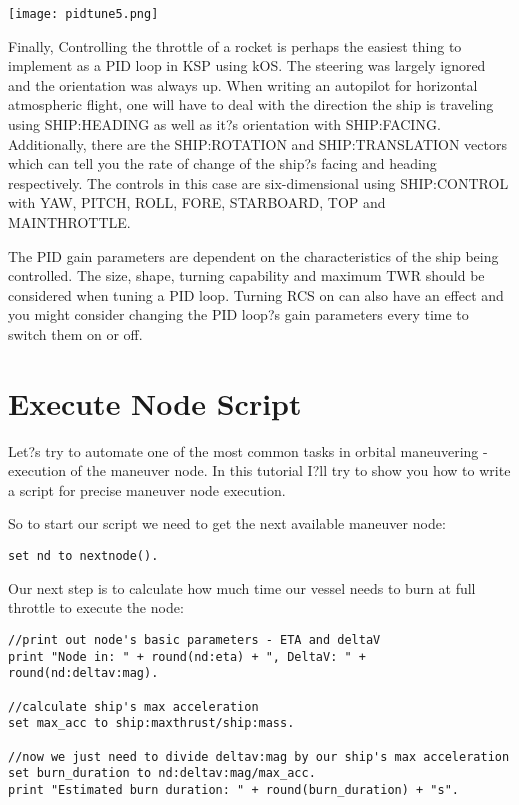 \begin{center}
\texttt{[image: pidtune5.png]}
\end{center}

Finally, Controlling the throttle of a rocket is perhaps the easiest thing to implement as a PID loop in KSP using kOS. The steering was largely ignored and the orientation was always up. When writing an autopilot for horizontal atmospheric flight, one will have to deal with the direction the ship is traveling using SHIP:HEADING as well as it?s orientation with SHIP:FACING. Additionally, there are the SHIP:ROTATION and SHIP:TRANSLATION vectors which can tell you the rate of change of the ship?s facing and heading respectively. The controls in this case are six-dimensional using SHIP:CONTROL with YAW, PITCH, ROLL, FORE, STARBOARD, TOP and MAINTHROTTLE.

The PID gain parameters are dependent on the characteristics of the ship being controlled. The size, shape, turning capability and maximum TWR should be considered when tuning a PID loop. Turning RCS on can also have an effect and you might consider changing the PID loop?s gain parameters every time to switch them on or off.

	\section{Execute Node Script}%
Let?s try to automate one of the most common tasks in orbital maneuvering - execution of the maneuver node. In this tutorial I?ll try to show you how to write a script for precise maneuver node execution.

So to start our script we need to get the next available maneuver node:

\begin{Verbatim}[frame=single]
set nd to nextnode().
\end{Verbatim} 

Our next step is to calculate how much time our vessel needs to burn at full throttle to execute the node:

\begin{Verbatim}[frame=single]
//print out node's basic parameters - ETA and deltaV
print "Node in: " + round(nd:eta) + ", DeltaV: " + round(nd:deltav:mag).

//calculate ship's max acceleration
set max_acc to ship:maxthrust/ship:mass.

//now we just need to divide deltav:mag by our ship's max acceleration
set burn_duration to nd:deltav:mag/max_acc.
print "Estimated burn duration: " + round(burn_duration) + "s".
\end{Verbatim} 

